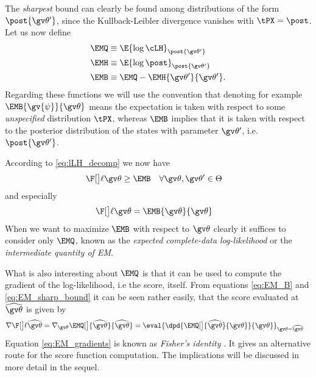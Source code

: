 The \emph{sharpest} bound can clearly be found among
distributions of the form $\post{\Th'}$, since the Kullback-Leibler divergence 
vanishes with $\tPX= \post$.
Let us now define
\begin{align}
	\EMQ &\equiv \E{\log\cLH}_{\post{\Th'}} \label{eq:EM_Q}\\
	\EMH &\equiv \E{\log\post}_{\post{\Th'}} \label{eq:EM_H}\\
	\EMB &\equiv \EMQ - \EMH{\Th'}{\Th'} \label{eq:EM_B}.
\end{align}
Regarding these functions we will use the convention that denoting for example $\EMB{\gv{\psi}}{\Th}$ means the
expectation is taken with respect to some \emph{unspecified} distribution $\tPX$, whereas $\EMB$ implies
that it is taken with respect to the posterior distribution of the states with parameter $\Th'$, i.e. $\post{\Th'}$. 


According to \eqref{eq:lLH_decomp} we now have
\begin{align}
	\lLH & \geq \EMB \quad \forall \Th,\Th' \in \Theta
	\label{eq:EM_LB}
\end{align}
and especially
\begin{align}
	\lLH & = \EMB{\Th}{\Th}
	\label{eq:EM_sharp_bound}
\end{align}
When we want to maximize $\EMB$ with respect to $\Th$
clearly it suffices to consider
only $\EMQ$, known as the \emph{expected complete-data log-likelihood}
or the \emph{intermediate quantity of EM}.

What is also interesting about $\EMQ$ is that it can be used to compute the gradient of the log-likelihood, i.e
the score, itself. From equations \eqref{eq:EM_B}
and \eqref{eq:EM_sharp_bound} it can be seen rather easily, that  
the score evaluated at $\widehat{\Th}$ is given by
\begin{align}
		\score[\widehat\Th]&=
		\nabla_{\Th}\EMQ[\big]{\widehat\Th}{\widehat\Th}
		=\eval{\dpd{ \EMQ[\big]{\widehat\Th}{\Th}}{\Th}}_{\Th=\widehat\Th} \label{eq:EM_gradients}
\end{align} 
Equation \eqref{eq:EM_gradients} is known as \emph{Fisher's identity} \parencite{Cappe2005}. It gives
an alternative route for the score function computation.
The implications will be discussed in more detail in the sequel.

